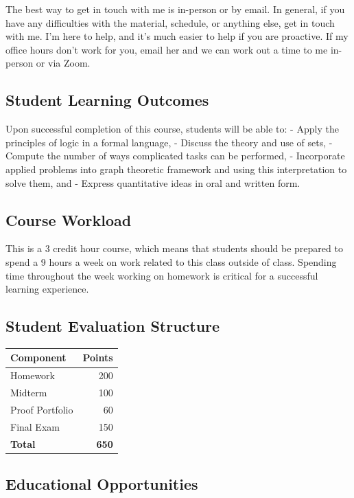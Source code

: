 \documentclass[
  letterpaper,
  DIV=11,
  numbers=noendperiod]{scrartcl}
\newcounter{none} %
\begin{document}
The best way to get in touch with me is in-person or by email. In
general, if you have any difficulties with the material, schedule, or
anything else, get in touch with me. I'm here to help, and it's much
easier to help if you are proactive. If my office hours don't work for
you, email her and we can work out a time to me in-person or via Zoom.

\subsection{Student Learning Outcomes}\label{student-learning-outcomes}

Upon successful completion of this course, students will be able to: -
Apply the principles of logic in a formal language, - Discuss the theory
and use of sets, - Compute the number of ways complicated tasks can be
performed, - Incorporate applied problems into graph theoretic framework
and using this interpretation to solve them, and - Express quantitative
ideas in oral and written form.

\subsection{Course Workload}\label{course-workload}

This is a 3 credit hour course, which means that students should be
prepared to spend a 9 hours a week on work related to this class outside
of class. Spending time throughout the week working on homework is
critical for a successful learning experience.

\subsection{Student Evaluation
Structure}\label{student-evaluation-structure}

{\def\LTcaptype{none} %
\begin{longtable}[]{@{}lr@{}}
\toprule\noalign{}
Component & Points \\
\midrule\noalign{}
\endhead
\bottomrule\noalign{}
\endlastfoot
Homework & 200 \\
Midterm & 100 \\
Proof Portfolio & 60 \\
Final Exam & 150 \\
\textbf{Total} & \textbf{650} \\
\end{longtable}
}

\subsection{Educational Opportunities}\label{educational-opportunities}
\end{document}
